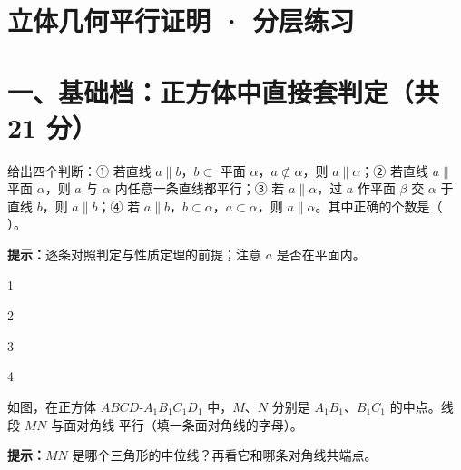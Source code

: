 \documentclass{exam-zh}
\begin{document}
\section*{立体几何平行证明 · 分层练习}

\section*{一、基础档：正方体中直接套判定（共 21 分）}


\begin{question}[points=5]
  给出四个判断：① 若直线 $a\parallel b$，$b\subset$ 平面 $\alpha$，$a\not\subset\alpha$，则 $a\parallel\alpha$；② 若直线 $a\parallel$ 平面 $\alpha$，则 $a$ 与 $\alpha$ 内任意一条直线都平行；③ 若 $a\parallel\alpha$，过 $a$ 作平面 $\beta$ 交 $\alpha$ 于直线 $b$，则 $a\parallel b$；④ 若 $a\parallel b$，$b\subset\alpha$，$a\subset\alpha$，则 $a\parallel\alpha$。其中正确的个数是（    ）。
  \begin{hintbox}
\textbf{提示：}逐条对照判定与性质定理的前提；注意 $a$ 是否在平面内。\end{hintbox}

  \begin{choices}
    \item 1
    \item 2
    \item 3
    \item 4
  \end{choices}
\end{question}



\begin{question}[points=6]
  \noindent
  \begin{minipage}[t]{\dimexpr\linewidth-60mm-6mm\relax}
    \vspace{0pt}
    如图，在正方体 $ABCD$-$A_{1}B_{1}C_{1}D_{1}$ 中，$M$、$N$ 分别是 $A_{1}B_{1}$、$B_{1}C_{1}$ 的中点。线段 $MN$ 与面对角线 \underline{\hspace{3em}} 平行（填一条面对角线的字母）。
    \begin{hintbox}
\textbf{提示：}$MN$ 是哪个三角形的中位线？再看它和哪条对角线共端点。\end{hintbox}

  \end{minipage}\hfill
  \begin{diagramcoltikz}{60mm}{$MN$ 是 $\triangle A_{1}B_{1}C_{1}$ 的中位线。}
  }
  \end{diagramcoltikz}
\end{question}
\end{document}
